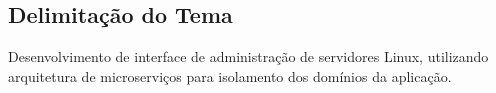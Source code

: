 \subsection{Delimitação do Tema}

  Desenvolvimento de interface de administração de servidores Linux,
  utilizando arquitetura de microserviços para isolamento dos
  domínios da aplicação.
